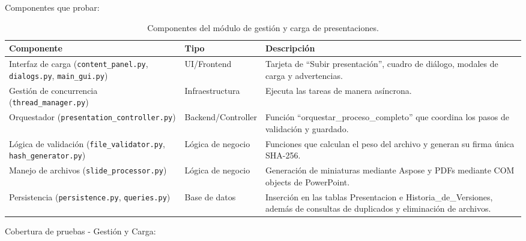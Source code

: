 \documentclass[11pt]{article}
\begin{document}
\clearpage
Componentes que probar:

\begin{table}[H]
    \centering
    \begin{longtable}{|L{0.34\textwidth}|L{0.18\textwidth}|L{0.38\textwidth}|}
        \hline
        \textbf{Componente} & \textbf{Tipo} & \textbf{Descripción} \\ \hline
        Interfaz de carga (\texttt{content\_panel.py}, \texttt{dialogs.py}, \texttt{main\_gui.py}) & UI/Frontend & Tarjeta de ``Subir presentación'', cuadro de diálogo, modales de carga y advertencias. \\ \hline
        Gestión de concurrencia (\texttt{thread\_manager.py}) & Infraestructura & Ejecuta las tareas de manera asíncrona. \\ \hline
        Orquestador (\texttt{presentation\_controller.py}) & Backend/Controller & Función ``orquestar\_proceso\_completo'' que coordina los pasos de validación y guardado. \\ \hline
        Lógica de validación (\texttt{file\_validator.py}, \texttt{hash\_generator.py}) & Lógica de negocio & Funciones que calculan el peso del archivo y generan su firma única SHA-256. \\ \hline
        Manejo de archivos (\texttt{slide\_processor.py}) & Lógica de negocio & Generación de miniaturas mediante Aspose y PDFs mediante COM objects de PowerPoint. \\ \hline
        Persistencia (\texttt{persistence.py}, \texttt{queries.py}) & Base de datos & Inserción en las tablas Presentacion e Historia\_de\_Versiones, además de consultas de duplicados y eliminación de archivos. \\ \hline
    \end{longtable}
    \caption{Componentes del módulo de gestión y carga de presentaciones.}
    \label{tab:componentes-modulo-carga}
\end{table}


Cobertura de pruebas - Gestión y Carga:
\end{document}
